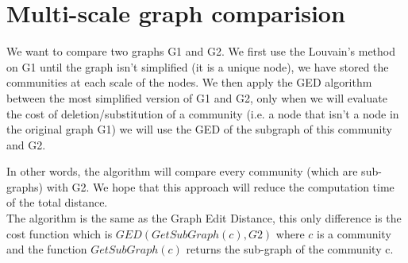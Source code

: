 \documentclass[UTF8, twoside]{EPURapport}
\begin{document}
\chapter{Multi-scale graph comparision}
	
	\hspace{4ex}We want to compare two graphs G1 and G2. We first use the Louvain's method on G1 until the graph isn't simplified (it is a unique node), we have stored the communities at each scale of the nodes. We then apply the GED algorithm between the most simplified version of G1 and G2, only when we will evaluate the cost of deletion/substitution of a community (i.e. a node that isn't a node in the original graph G1) we will use the GED of the subgraph of this community and G2.
	
	In other words, the algorithm will compare every community (which are sub-graphs) with G2. We hope that this approach will reduce the computation time of the total distance. 
\\

	The algorithm is the same as the Graph Edit Distance, this only difference is the cost function which is $GED(GetSubGraph(c),G2)$ where $c$ is a community and the function $GetSubGraph(c)$ returns the sub-graph of the community c. 
	
\end{document}
